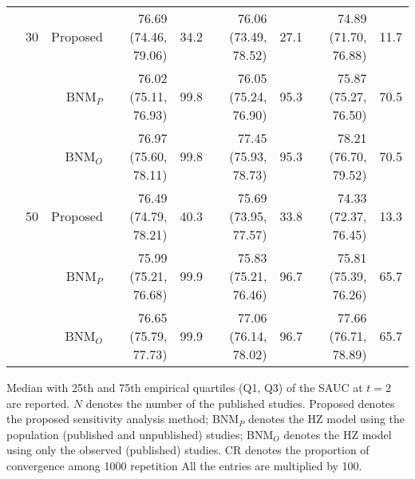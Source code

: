 \begin{table}[!htb]
\begin{threeparttable}
\begin{tabular}[t]{rrrrrrrrr}
\addlinespace
 & 30 & Proposed & 76.69 (74.46, 79.06) & 34.2 & 76.06 (73.49, 78.52) & 27.1 & 74.89 (71.70, 76.88) & 11.7\\
 &  & BNM$_P$ & 76.02 (75.11, 76.93) & 99.8 & 76.05 (75.24, 76.90) & 95.3 & 75.87 (75.27, 76.50) & 70.5\\
 &  & BNM$_O$ & 76.97 (75.60, 78.11) & 99.8 & 77.45 (75.93, 78.73) & 95.3 & 78.21 (76.70, 79.52) & 70.5\\
\addlinespace
 & 50 & Proposed & 76.49 (74.79, 78.21) & 40.3 & 75.69 (73.95, 77.57) & 33.8 & 74.33 (72.37, 76.45) & 13.3\\
 &  & BNM$_P$ & 75.99 (75.21, 76.68) & 99.9 & 75.83 (75.21, 76.46) & 96.7 & 75.81 (75.39, 76.26) & 65.7\\
 &  & BNM$_O$ & 76.65 (75.79, 77.73) & 99.9 & 77.06 (76.14, 78.02) & 96.7 & 77.66 (76.71, 78.89) & 65.7\\
\bottomrule
\end{tabular}
\begin{tablenotes}
\item 
			Median with 25th and 75th empirical quartiles (Q1, Q3) of the SAUC at $t=2$ are reported. 
			$N$ denotes the number of the published studies. 
			Proposed denotes the proposed sensitivity analysis method;
			BNM$_P$ denotes the HZ model using the population (published and unpublished) studies; 
			BNM$_O$ denotes the HZ model using only the observed (published) studies.
			CR denotes the proportion of convergence among 1000 repetition
			All the entries are multiplied by 100.
\end{tablenotes}
\end{threeparttable}
\end{table}
